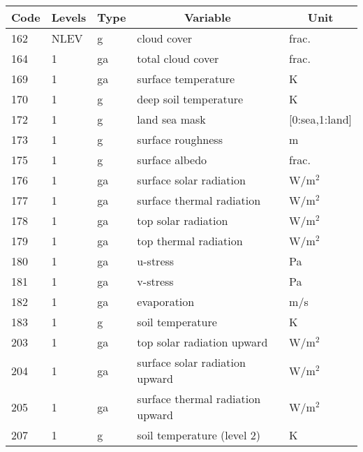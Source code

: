 \documentclass[a4paper,12pt]{article}
\begin{document}
\begin{table}[t]

\begin{tabular}[t]{|l|l|l|l|l|} \hline
\multicolumn{1}{|c|}{Code} &
\multicolumn{1}{c|}{Levels}&
\multicolumn{1}{c|}{Type} &
\multicolumn{1}{c|}{Variable} &
\multicolumn{1}{c|}{Unit} \\ \hline \hline

162 & NLEV & g  & cloud cover                      & frac.           \\ \hline
164 & 1    & ga & total cloud cover                & frac.           \\ \hline
169 & 1    & ga & surface temperature              & K               \\ \hline
170 & 1    & g  & deep soil temperature            & K               \\ \hline
172 & 1    & g  & land sea mask                    & [0:sea,1:land]   \\ \hline
173 & 1    & g  & surface roughness                & m               \\ \hline
175 & 1    & g  & surface albedo                   & frac.           \\ \hline
176 & 1    & ga & surface solar radiation          & W/m$^{2}$       \\ \hline
177 & 1    & ga & surface thermal radiation        & W/m$^{2}$       \\ \hline
178 & 1    & ga & top solar radiation              & W/m$^{2}$       \\ \hline
179 & 1    & ga & top thermal radiation            & W/m$^{2}$       \\ \hline
180 & 1    & ga & u-stress                         & Pa              \\ \hline
181 & 1    & ga & v-stress                         & Pa              \\ \hline
182 & 1    & ga & evaporation                      & m/s             \\ \hline
183 & 1    & g  & soil temperature                 & K               \\ \hline
203 & 1    & ga & top solar radiation upward       & W/m$^{2}$       \\ \hline
204 & 1    & ga & surface solar radiation upward   & W/m$^{2}$       \\ \hline
205 & 1    & ga & surface thermal radiation upward & W/m$^{2}$       \\ \hline
207 & 1    & g  & soil temperature (level 2)       & K               \\ \hline

\end{tabular}
\end{table}
\end{document}
